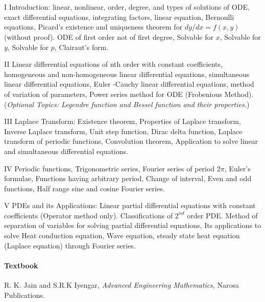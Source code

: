 \section{\courseinfo}
\unit{I}
Introduction: linear, nonlinear, order, degree, and types of solutions of ODE, exact differential equations, integrating factors, linear equation, Bernoulli equations, Picard's existence and uniqueness theorem for $dy/dx=f(x,y)$ (without proof). ODE of first order not of first degree, Solvable for $x$, Solvable for $y$, Solvable for $p$, Clairaut's form.

\unit{II}
Linear differential equations of nth order with constant coefficients, homogeneous and non-homogeneous linear differential equations, simultaneous linear differential equations, Euler -Cauchy linear differential equations, method of variation of parameters, %
Power series method for ODE (Frobenious Method).
(\emph{Optional Topics: Legendre function and Bessel function and their properties.})

\unit{III}
Laplace Transform: Existence theorem, Properties of Laplace transform, Inverse Laplace transform, Unit step function, Dirac delta function, Laplace transform of periodic functions, Convolution theorem, Application to solve linear and simultaneous differential equations. 

\unit{IV}
Periodic functions, Trigonometric series, Fourier series of period $2\pi$, Euler's formulae, Functions having arbitrary period, Change of interval, Even and odd functions, Half range sine and cosine Fourier series. 

\unit{V} PDEs and its Applications: 
Linear partial differential equations with constant coefficients (Operator method only). Classifications of $2^{nd}$ order PDE. Method of separation of variables for solving partial differential equations, Its applications to solve  Heat conduction equation, Wave equation, steady state heat equation (Laplace equation) through Fourier series.

\paragraph{Textbook}
R. K. Jain and S.R.K Iyengar, \emph{Advanced Engineering Mathematics}, Narosa Publications.

